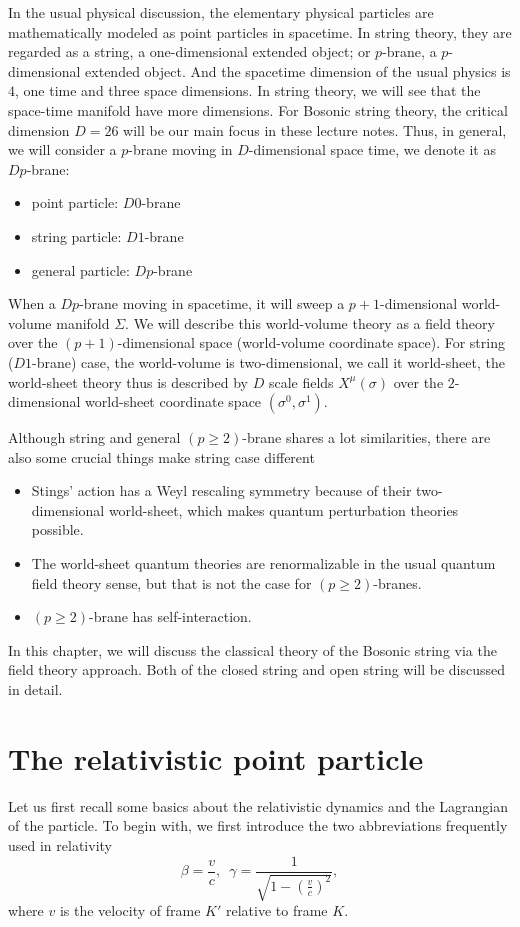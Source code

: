 \documentclass[graybox,envcountchap,sectrefs]{svmono}
\begin{document}
 
In the usual physical discussion, the elementary physical particles are mathematically modeled as point particles in spacetime. In string theory, they are regarded as a string, a one-dimensional extended object; or $p$-brane, a $p$-dimensional extended object. And the spacetime dimension of the usual physics is $4$, one time and three space dimensions. In string theory, we will see that the space-time manifold have more dimensions. For Bosonic string theory, the critical dimension $D=26$ will be our main focus in these lecture notes. Thus, in general, we will consider a $p$-brane moving in $D$-dimensional space time, we denote it as $Dp$-brane:
\begin{itemize}
\item point particle: $D0$-brane
\item string particle: $D1$-brane
\item general particle: $Dp$-brane
\end{itemize}
When a $Dp$-brane moving in spacetime, it will sweep a $p+1$-dimensional world-volume manifold $\Sigma$. We will describe this world-volume theory as a field theory over the $(p+1)$-dimensional space (world-volume coordinate space).
For string ($D1$-brane) case, the world-volume is two-dimensional, we call it world-sheet, the world-sheet theory thus is described by $D$ scale fields $X^{\mu}(\sigma)$ over the $2$-dimensional world-sheet coordinate space $(\sigma^0,\sigma^1)$. 



Although string and general $(p\geq 2)$-brane shares a lot similarities, there are also some crucial things make string case different
\begin{itemize}
\item Stings' action has a Weyl rescaling symmetry because of their two-dimensional world-sheet, which makes quantum perturbation theories possible.
\item The world-sheet quantum theories are renormalizable in the usual quantum field theory sense, but that is not the case for $(p\geq 2)$-branes. 
\item $(p\geq 2)$-brane has self-interaction.
\end{itemize}


In this chapter, we will discuss the classical theory of the Bosonic string via the field theory approach. Both of the closed string and open string will be discussed in detail.



\section{The relativistic point particle}
Let us first recall some basics about the relativistic dynamics and the Lagrangian of the particle. To begin with, we first introduce the two abbreviations frequently used in relativity
\[\beta=\frac{v}{c},\,\,\,\gamma=\frac{1}{\sqrt{1-(\frac{v}{c})^2}},\]
where $v$ is the velocity of frame $K'$ relative to frame $K$.
\end{document}
